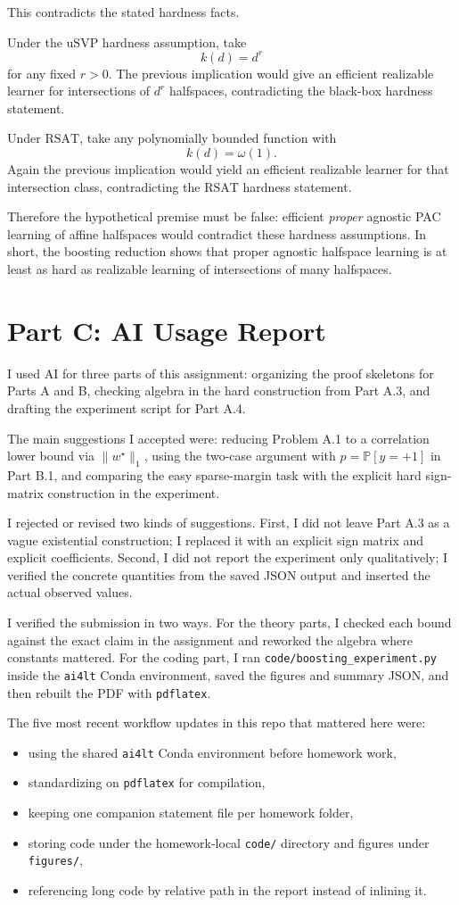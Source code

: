 \documentclass{article}
\newcommand{\PP}{\mathbb{P}}
\begin{document}
This contradicts the stated hardness facts.

Under the $\mathrm{uSVP}$ hardness assumption, take
$$
k(d)=d^r
$$
for any fixed $r>0$. The previous implication would give an efficient realizable learner for intersections of $d^r$ halfspaces, contradicting the black-box hardness statement.

Under $\mathrm{RSAT}$, take any polynomially bounded function with
$$
k(d)=\omega(1).
$$
Again the previous implication would yield an efficient realizable learner for that intersection class, contradicting the $\mathrm{RSAT}$ hardness statement.

Therefore the hypothetical premise must be false: efficient \emph{proper} agnostic PAC learning of affine halfspaces would contradict these hardness assumptions. In short, the boosting reduction shows that proper agnostic halfspace learning is at least as hard as realizable learning of intersections of many halfspaces.

\newpage
\section{Part C: AI Usage Report}

I used AI for three parts of this assignment: organizing the proof skeletons for Parts A and B, checking algebra in the hard construction from Part A.3, and drafting the experiment script for Part A.4.

The main suggestions I accepted were: reducing Problem A.1 to a correlation lower bound via $\|w^\star\|_1$, using the two-case argument with $p=\PP[y=+1]$ in Part B.1, and comparing the easy sparse-margin task with the explicit hard sign-matrix construction in the experiment.

I rejected or revised two kinds of suggestions. First, I did not leave Part A.3 as a vague existential construction; I replaced it with an explicit sign matrix and explicit coefficients. Second, I did not report the experiment only qualitatively; I verified the concrete quantities from the saved JSON output and inserted the actual observed values.

I verified the submission in two ways. For the theory parts, I checked each bound against the exact claim in the assignment and reworked the algebra where constants mattered. For the coding part, I ran \verb|code/boosting_experiment.py| inside the \verb|ai4lt| Conda environment, saved the figures and summary JSON, and then rebuilt the PDF with \verb|pdflatex|.

The five most recent workflow updates in this repo that mattered here were:
\begin{itemize}
\item using the shared \verb|ai4lt| Conda environment before homework work,
\item standardizing on \verb|pdflatex| for compilation,
\item keeping one companion statement file per homework folder,
\item storing code under the homework-local \verb|code/| directory and figures under \verb|figures/|,
\item referencing long code by relative path in the report instead of inlining it.
\end{itemize}
\end{document}
